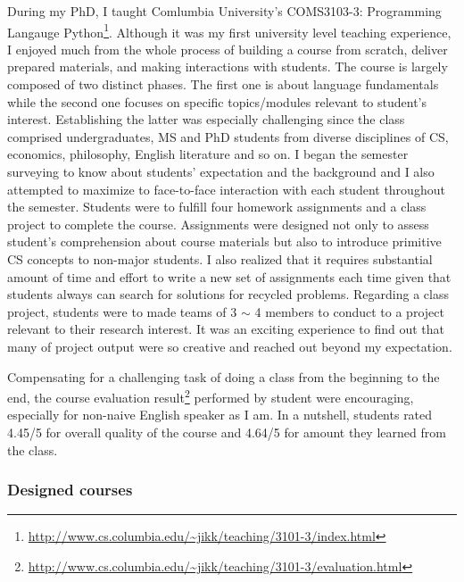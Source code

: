 \documentclass[letterpaper, 10pt]{article}
\begin{document}
\begin{small}
During my PhD, I taught Comlumbia University's COMS3103-3: Programming Langauge
Python\footnote{\url{http://www.cs.columbia.edu/~jikk/teaching/3101-3/index.html}}.
%
%
Although it was my first university level teaching experience, I enjoyed much
from the whole process of building a course from scratch, deliver prepared
materials, and making interactions with students.
% 
The course is largely composed of two distinct phases. The first one is about
language fundamentals while the second one focuses on specific topics/modules
relevant to student's interest. Establishing the latter was especially
challenging since the class comprised undergraduates, MS and PhD students from
diverse disciplines of CS, economics, philosophy, English literature and so on.
%
I began the semester surveying to know about students' expectation and the
background and I also attempted to maximize to face-to-face interaction with
each student throughout the semester.
% 
Students were to fulfill four homework assignments and a class project to
complete the course. 
%
Assignments were designed not only to assess student's comprehension about
course materials but also to introduce primitive CS concepts to non-major
students.
%
%
I also realized that it requires  substantial amount of time and effort to
write a new set of assignments each time given that students always can search
for solutions for recycled problems. 
%
Regarding a class project, students were to made teams of 3 $\sim$ 4 members to
conduct to a project relevant to their research interest.
%
It was an exciting experience to find out that many of project output were so
creative and reached out beyond my expectation.
%
%

Compensating for a challenging task of doing a class from the beginning to the
end, the course evaluation
result\footnote{\url{http://www.cs.columbia.edu/~jikk/teaching/3101-3/evaluation.html}}
performed by student were encouraging, especially for non-naive English speaker
as I am. In a nutshell, students rated 4.45/5 for overall quality of the course
and 4.64/5 for amount they learned from the class.

\subsubsection*{Designed courses} 


\end{small}
\end{document}
